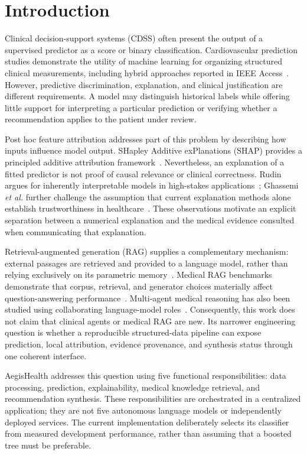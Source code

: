 \documentclass[journal]{IEEEtran}
\newcommand{\system}{AegisHealth}
\begin{document}
\section{Introduction}
Clinical decision-support systems (CDSS) often present the output of a supervised predictor as a score or binary classification. Cardiovascular prediction studies demonstrate the utility of machine learning for organizing structured clinical measurements, including hybrid approaches reported in IEEE Access~\cite{mohan2019}. However, predictive discrimination, explanation, and clinical justification are different requirements. A model may distinguish historical labels while offering little support for interpreting a particular prediction or verifying whether a recommendation applies to the patient under review.

Post hoc feature attribution addresses part of this problem by describing how inputs influence model output. SHapley Additive exPlanations (SHAP) provides a principled additive attribution framework~\cite{lundberg2017}. Nevertheless, an explanation of a fitted predictor is not proof of causal relevance or clinical correctness. Rudin argues for inherently interpretable models in high-stakes applications~\cite{rudin2019}; Ghassemi \emph{et al.} further challenge the assumption that current explanation methods alone establish trustworthiness in healthcare~\cite{ghassemi2021}. These observations motivate an explicit separation between a numerical explanation and the medical evidence consulted when communicating that explanation.

Retrieval-augmented generation (RAG) supplies a complementary mechanism: external passages are retrieved and provided to a language model, rather than relying exclusively on its parametric memory~\cite{lewis2020}. Medical RAG benchmarks demonstrate that corpus, retrieval, and generator choices materially affect question-answering performance~\cite{xiong2024}. Multi-agent medical reasoning has also been studied using collaborating language-model roles~\cite{tang2024}. Consequently, this work does not claim that clinical agents or medical RAG are new. Its narrower engineering question is whether a reproducible structured-data pipeline can expose prediction, local attribution, evidence provenance, and synthesis status through one coherent interface.

\system{} addresses this question using five functional responsibilities: data processing, prediction, explainability, medical knowledge retrieval, and recommendation synthesis. These responsibilities are orchestrated in a centralized application; they are not five autonomous language models or independently deployed services. The current implementation deliberately selects its classifier from measured development performance, rather than assuming that a boosted tree must be preferable.
\end{document}
